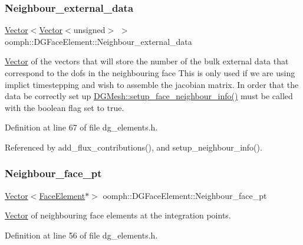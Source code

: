 \subsubsection{\texorpdfstring{Neighbour\+\_\+external\+\_\+data}{Neighbour\_external\_data}}
{\footnotesize\ttfamily \hyperlink{classoomph_1_1Vector}{Vector}$<$\hyperlink{classoomph_1_1Vector}{Vector}$<$unsigned$>$ $>$ oomph\+::\+D\+G\+Face\+Element\+::\+Neighbour\+\_\+external\+\_\+data\hspace{0.3cm}{\ttfamily [private]}}

\hyperlink{classoomph_1_1Vector}{Vector} of the vectors that will store the number of the bulk external data that correspond to the dofs in the neighbouring face This is only used if we are using implict timestepping and wish to assemble the jacobian matrix. In order that the data be correctly set up \hyperlink{classoomph_1_1DGMesh_ac8839d6d15a037536217b84e32dd2ae3}{D\+G\+Mesh\+::setup\+\_\+face\+\_\+neighbour\+\_\+info()} must be called with the boolean flag set to true. 

Definition at line 67 of file dg\+\_\+elements.\+h.



Referenced by add\+\_\+flux\+\_\+contributions(), and setup\+\_\+neighbour\+\_\+info().

\mbox{\label{classoomph_1_1DGFaceElement_a35240deb7d12eebe5e45e5e4ff2e9dae}} 
\subsubsection{\texorpdfstring{Neighbour\+\_\+face\+\_\+pt}{Neighbour\_face\_pt}}
{\footnotesize\ttfamily \hyperlink{classoomph_1_1Vector}{Vector}$<$\hyperlink{classoomph_1_1FaceElement}{Face\+Element}$\ast$$>$ oomph\+::\+D\+G\+Face\+Element\+::\+Neighbour\+\_\+face\+\_\+pt\hspace{0.3cm}{\ttfamily [private]}}



\hyperlink{classoomph_1_1Vector}{Vector} of neighbouring face elements at the integration points. 



Definition at line 56 of file dg\+\_\+elements.\+h.



